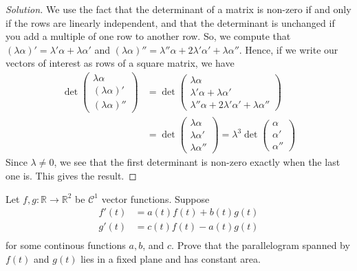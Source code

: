 \documentclass[Shifrin_Solutions_Spring_2015]{subfiles}
\begin{document}
\begin{proof}[Solution]
We use the fact that the determinant of a matrix is non-zero if and only if the rows are linearly independent, and that the determinant is unchanged if you add a multiple of one row to another row.
So, we compute that $(\lambda \alpha) ' = \lambda' \alpha  + \lambda \alpha'$ and $(\lambda\alpha)'' = \lambda'' \alpha + 2\lambda'\alpha' + \lambda\alpha''$. Hence, if we write our vectors of interest as rows of a square matrix, we have
\[
\begin{split}
\det \begin{pmatrix} \lambda \alpha \\ (\lambda\alpha)' \\ (\lambda\alpha)'' \end{pmatrix} & =  \det \begin{pmatrix} \lambda\alpha \\ \lambda' \alpha  + \lambda \alpha' \\ \lambda'' \alpha + 2\lambda'\alpha' + \lambda\alpha''\end{pmatrix} \\
& = \det \begin{pmatrix} \lambda \alpha \\ \lambda \alpha' \\ \lambda \alpha'' \end{pmatrix}
 = \lambda^3 \det \begin{pmatrix} \alpha \\ \alpha' \\ \alpha''\end{pmatrix}
\end{split}
\]
Since $\lambda \neq 0$, we see that the first determinant is non-zero exactly when the last one is. This gives the result.
\end{proof}


\vspace{1cm}


\begin{exercise}
Let $f, g: \mathbb{R} \rightarrow \mathbb{R}^2$ be $\mathcal{C}^1$ vector functions. Suppose
\begin{align*}
f'(t) &= a(t) f(t) + b(t)g(t) \\
g'(t) &= c(t)f(t) - a(t)g(t) \\
\end{align*}
for some continous functions $a, b$, and $c$. Prove that the parallelogram spanned by $f(t)$ and $g(t)$ lies in a fixed plane and has constant area.
\end{exercise}
\end{document}
